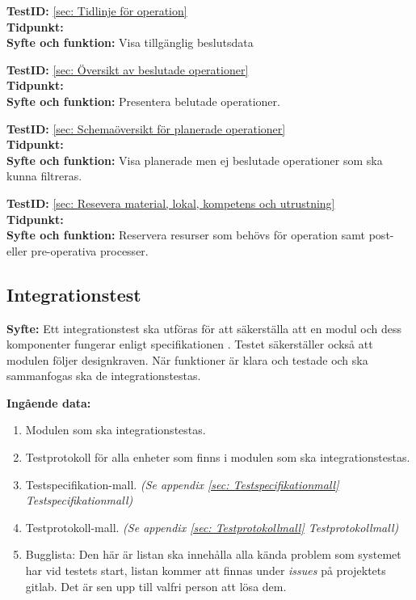 \documentclass[a4paper,10pt, twoside]{article}
\begin{document}
\textbf{TestID:} \ref{sec: Tidlinje för operation}
\\ \textbf{Tidpunkt:}
\\ \textbf{Syfte och funktion:} Visa tillgänglig beslutsdata

\textbf{TestID:} \ref{sec: Översikt av beslutade operationer}
\\ \textbf{Tidpunkt:}  
\\ \textbf{Syfte och funktion:} Presentera belutade operationer.

\textbf{TestID:} \ref{sec: Schemaöversikt för planerade operationer}
\\ \textbf{Tidpunkt:}  
\\ \textbf{Syfte och funktion:} Visa planerade men ej beslutade operationer som ska kunna filtreras.
  
\textbf{TestID:} \ref{sec: Resevera material, lokal, kompetens och utrustning} 
\\ \textbf{Tidpunkt:}
\\ \textbf{Syfte och funktion:} Reservera resurser som behövs för operation samt post- eller pre-operativa processer.

\subsection{Integrationstest}
\label{sec:Integrationstest}
\textbf{Syfte:} Ett integrationstest ska utföras för att säkerställa att en modul och dess komponenter fungerar enligt 
specifikationen \cite{kravspec}. Testet säkerställer också att modulen följer designkraven. När funktioner är klara och 
testade och ska sammanfogas ska de integrationstestas.

\textbf{Ingående data:}
\begin{enumerate}
	\item Modulen som ska integrationstestas.
    \item Testprotokoll för alla enheter som finns i modulen som ska integrationstestas.
    \item Testspecifikation-mall. \emph{(Se appendix \ref{sec: Testspecifikationmall} {Testspecifikationmall})}
    \item Testprotokoll-mall. \emph{(Se appendix \ref{sec: Testprotokollmall} Testprotokollmall)}
    \item Bugglista: Den här är listan ska innehålla alla kända problem som systemet har vid testets start, listan kommer 
    att finnas under \emph{issues} på projektets gitlab. Det är sen upp till valfri person att lösa dem.
\end{enumerate}
\end{document}
